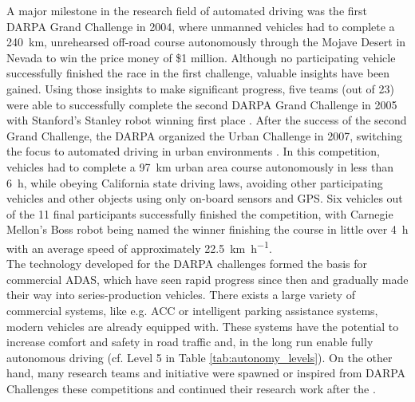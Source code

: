 A major milestone in the research field of automated driving was the first \ac{DARPA} Grand Challenge in 2004, where unmanned vehicles had to complete a \SI{240}{\kilo\meter}, unrehearsed off-road course autonomously through the Mojave Desert in Nevada to win the price money of \$1 million. 
Although no participating vehicle successfully finished the race \cite{Bacha2004} in the first challenge, valuable insights have been gained.
Using those insights to make significant progress, five teams (out of 23) were able to successfully complete the second \ac{DARPA} Grand Challenge in 2005 with Stanford's Stanley robot winning first place \cite{Thrun2006}.
After the success of the second Grand Challenge, the \ac{DARPA} organized the Urban Challenge in 2007, switching the focus to automated driving in urban environments \cite{Buehler2009}.
In this competition, vehicles had to complete a \SI{97}{\kilo\meter} urban area course autonomously in less than \SI{6}{\hour}, while obeying California state driving laws, avoiding other participating vehicles and other objects using only on-board sensors and \ac{GPS}.
Six vehicles out of the 11 final participants successfully finished the competition, with Carnegie Mellon's Boss robot \cite{Urmson.2008} being named the winner finishing the course in little over \SI{4}{\hour} with an average speed of approximately \SI[per-mode=symbol]{22.5}{\kilo\meter\per\hour}.
\\
The technology developed for the \ac{DARPA} challenges formed the basis for commercial \ac{ADAS}, which have seen rapid progress since then and gradually made their way into series-production vehicles.
There exists a large variety of commercial systems, like e.g. \ac{ACC} or intelligent parking assistance systems, modern vehicles are already equipped with.
These systems have the potential to increase comfort and safety in road traffic and, in the long run enable fully autonomous driving (cf. Level 5 in Table \ref{tab:autonomy_levels}). 
On the other hand, many research teams and initiative were spawned or inspired from \ac{DARPA} Challenges these competitions and continued their research work after the .
